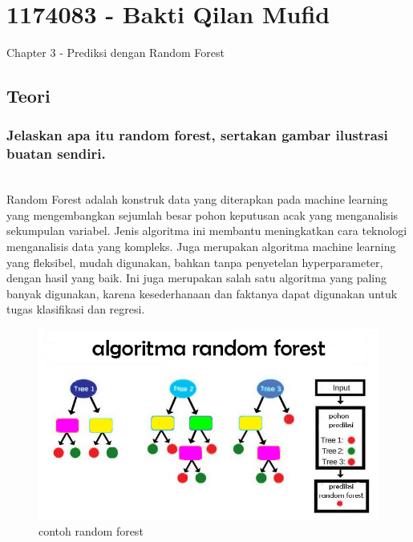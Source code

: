 \section{1174083 - Bakti Qilan Mufid}
Chapter 3 - Prediksi dengan Random Forest
\subsection{Teori}
\subsubsection{ Jelaskan apa itu random forest, sertakan gambar ilustrasi buatan sendiri.}
\hfill\\
Random Forest adalah konstruk data yang diterapkan pada machine learning yang mengembangkan sejumlah besar pohon keputusan acak yang menganalisis sekumpulan variabel. Jenis algoritma ini membantu meningkatkan cara teknologi menganalisis data yang kompleks. Juga merupakan algoritma machine learning yang ﬂeksibel, mudah digunakan, bahkan tanpa penyetelan hyperparameter, dengan hasil yang baik. Ini juga merupakan salah satu algoritma yang paling banyak digunakan, karena kesederhanaan dan faktanya dapat digunakan untuk tugas klasiﬁkasi dan regresi.

\begin{figure}[H]
	\centering
	\includegraphics[width=12cm]{figures/1174083/figures3/1.png}
	\caption{contoh random forest}
\end{figure}


